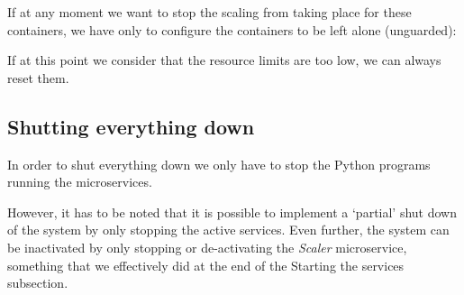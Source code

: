 \documentclass[12pt]{article}
\begin{document}
If at any moment we want to stop the scaling from taking place for these containers, we have only to configure the containers to be left alone (unguarded): \newline

\noindent {} \newline
{} \newline

If at this point we consider that the resource limits are too low, we can always reset them.

\subsection{Shutting everything down}

In order to shut everything down we only have to stop the Python programs running the microservices.

However, it has to be noted that it is possible to implement a `partial' shut down of the system by only stopping the active services. Even further, the system can be inactivated by only stopping or de-activating the \textit{Scaler} microservice, something that we effectively did at the end of the Starting the services subsection.
\end{document}
